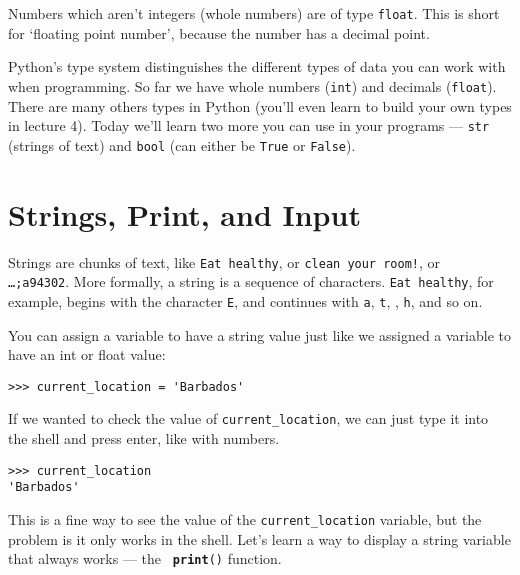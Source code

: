 Numbers which aren’t integers (whole numbers) are of type \texttt{\textquotesingle float\textquotesingle}. This is short for `floating point number', because the number has a decimal point.

Python’s type system distinguishes the different types of data you can work with when programming. So far we have whole numbers (\texttt{\textquotesingle int\textquotesingle}) and decimals (\texttt{\textquotesingle float\textquotesingle}). There are many others types in Python (you’ll even learn to build your own types in lecture 4). Today we’ll learn two more you can use in your programs --- \texttt{\textquotesingle str\textquotesingle} (strings of text) and \texttt{\textquotesingle bool\textquotesingle} (can either be \texttt{True} or \texttt{False}).



\section*{Strings, Print, and Input}

Strings are chunks of text, like \texttt{\textquotesingle Eat healthy\textquotesingle}, or \texttt{\textquotesingle clean your room!\textquotesingle}, or\\ \texttt{\textquotesingle…;a94302\textquotesingle}. More formally, a string is a sequence of characters. \texttt{\textquotesingle Eat healthy\textquotesingle}, for example, begins with the character \texttt{\textquotesingle E\textquotesingle}, and continues with \texttt{\textquotesingle a\textquotesingle}, \texttt{\textquotesingle t\textquotesingle}, \texttt{\textquotesingle\textvisiblespace\textquotesingle}, \texttt{\textquotesingle h\textquotesingle}, and so on. 

You can assign a variable to have a string value just like we assigned a variable to have an int or float value:

\begin{lstlisting}[numbers=none]
>>> current_location = 'Barbados'
\end{lstlisting}

If we wanted to check the value of \texttt{current\_location}, we can just type it into the shell and press enter, like with numbers.

\begin{lstlisting}[numbers=none]
>>> current_location
'Barbados'
\end{lstlisting}

This is a fine way to see the value of the \texttt{current\_location} variable, but the problem is it only works in the shell. Let’s learn a way to display a string variable that always works --- the \texttt{\textbf{ print}()} function.

